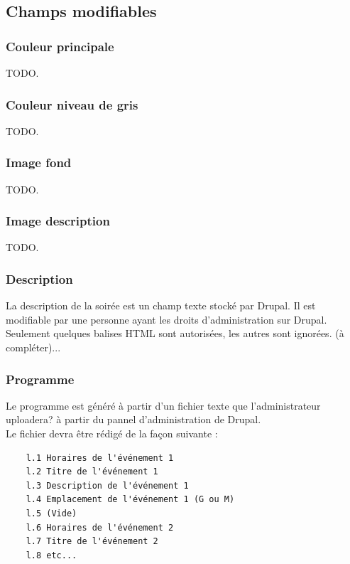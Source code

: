 \documentclass[11pt]{report}
\begin{document}
\vspace{0.5cm}

\subsection{Champs modifiables}

\subsubsection{Couleur principale}

TODO.

\subsubsection{Couleur niveau de gris}

TODO.

\subsubsection{Image fond}

TODO.

\subsubsection{Image description}

TODO.

\subsubsection{Description}

La description de la soirée est un champ texte stocké par Drupal. Il est
modifiable par une personne ayant les droits d'administration sur Drupal.
Seulement quelques balises HTML sont autorisées, les autres sont ignorées.
(à compléter)...

\subsubsection{Programme}

Le programme est généré à partir d'un fichier texte que l'administrateur
uploadera? à partir du pannel d'administration de Drupal. \\
Le fichier devra être rédigé de la façon suivante :
\begin{verbatim}
	l.1 Horaires de l'événement 1
	l.2 Titre de l'événement 1
	l.3 Description de l'événement 1
	l.4 Emplacement de l'événement 1 (G ou M)
	l.5 (Vide)
	l.6 Horaires de l'événement 2
	l.7 Titre de l'événement 2
	l.8 etc...
\end{verbatim}
\end{document}
